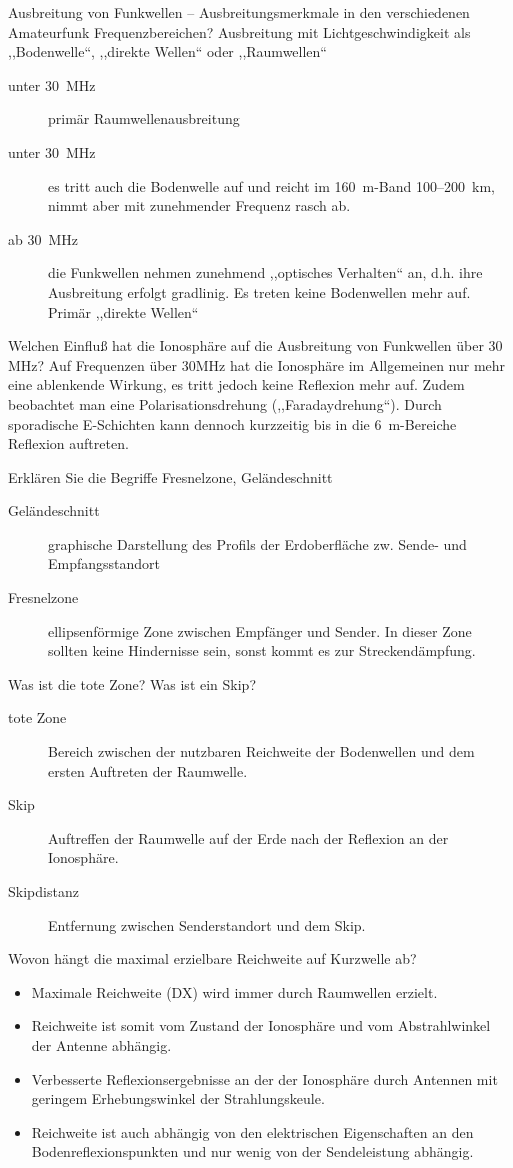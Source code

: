 \documentclass[avery5371,grid,frame,a4paper]{flashcards}
\newcommand{\card}[3]{
  \begin{flashcard}[{\chap} -- #1]{#2}#3\end{flashcard}
}
\begin{document}
\card{13}{Ausbreitung von Funkwellen -- Ausbreitungsmerkmale in den verschiedenen Amateurfunk Frequenzbereichen?}{
  \small
  Ausbreitung mit Lichtgeschwindigkeit als ,,Bodenwelle``, ,,direkte Wellen`` oder ,,Raumwellen``
  \begin{description}
    \item[unter 30~MHz] primär Raumwellenausbreitung
    \item[unter 30~MHz] es tritt auch die Bodenwelle auf und reicht im 160~m-Band 100--200~km, nimmt aber mit zunehmender Frequenz rasch ab.
    \item[ab 30~MHz] die Funkwellen nehmen zunehmend ,,optisches Verhalten`` an, d.h. ihre Ausbreitung erfolgt gradlinig. Es treten keine Bodenwellen mehr auf. Primär ,,direkte Wellen``
  \end{description}
}
\card{14}{Welchen Einfluß hat die Ionosphäre auf die Ausbreitung von Funkwellen über 30 MHz?}{
  Auf Frequenzen über 30MHz hat die Ionosphäre im Allgemeinen nur mehr eine ablenkende Wirkung, es tritt jedoch keine Reflexion mehr auf. Zudem beobachtet man eine Polarisationsdrehung (,,Faradaydrehung``). Durch sporadische E-Schichten kann dennoch kurzzeitig bis in die 6~m-Bereiche Reflexion auftreten.
}
\card{15}{Erklären Sie die Begriffe Fresnelzone, Geländeschnitt}{
  \begin{description}
  \item[Geländeschnitt] graphische Darstellung des Profils der Erdoberfläche zw. Sende- und Empfangsstandort
  \item[Fresnelzone] ellipsenförmige Zone zwischen Empfänger und Sender. In dieser Zone sollten keine Hindernisse sein, sonst kommt es zur Streckendämpfung.
  \end{description}
}
\card{16}{Was ist die tote Zone? Was ist ein Skip?}{
  \begin{description}
    \item[tote Zone] Bereich zwischen der nutzbaren Reichweite der Bodenwellen und dem ersten Auftreten der Raumwelle.
    \item[Skip] Auftreffen der Raumwelle auf der Erde nach der Reflexion an der Ionosphäre.
    \item[Skipdistanz] Entfernung zwischen Senderstandort und dem Skip.
  \end{description}
}
\card{17}{Wovon hängt die maximal erzielbare Reichweite auf Kurzwelle ab?}{
  \small
  \begin{itemize}
    \item Maximale Reichweite (DX) wird immer durch Raumwellen erzielt.
    \item Reichweite ist somit vom Zustand der Ionosphäre und vom Abstrahlwinkel der Antenne abhängig.
    \item Verbesserte Reflexionsergebnisse an der der Ionosphäre durch Antennen mit geringem Erhebungswinkel der Strahlungskeule.
    \item Reichweite ist auch abhängig von den elektrischen Eigenschaften an den Bodenreflexionspunkten und nur wenig von der Sendeleistung abhängig.
  \end{itemize}
}
\end{document}
